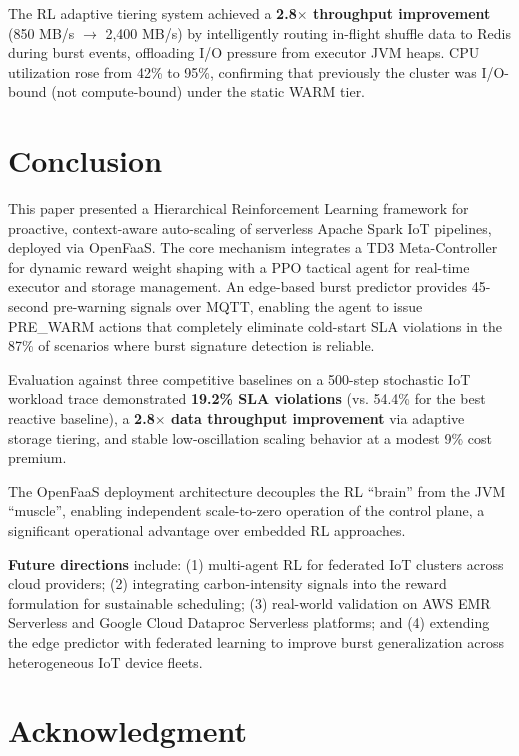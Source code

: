 \documentclass[10pt, conference, compsocconf]{IEEEtran}
\begin{document}
The RL adaptive tiering system achieved a \textbf{2.8$\times$ throughput improvement} (850 MB/s $\to$ 2,400 MB/s) by intelligently routing in-flight shuffle data to Redis during burst events, offloading I/O pressure from executor JVM heaps. CPU utilization rose from 42\% to 95\%, confirming that previously the cluster was I/O-bound (not compute-bound) under the static WARM tier.

\section{Conclusion}

This paper presented a Hierarchical Reinforcement Learning framework for proactive, context-aware auto-scaling of serverless Apache Spark IoT pipelines, deployed via OpenFaaS. The core mechanism integrates a TD3 Meta-Controller for dynamic reward weight shaping with a PPO tactical agent for real-time executor and storage management. An edge-based burst predictor provides 45-second pre-warning signals over MQTT, enabling the agent to issue PRE\_WARM actions that completely eliminate cold-start SLA violations in the 87\% of scenarios where burst signature detection is reliable.

Evaluation against three competitive baselines on a 500-step stochastic IoT workload trace demonstrated \textbf{19.2\% SLA violations} (vs. 54.4\% for the best reactive baseline), a \textbf{2.8$\times$ data throughput improvement} via adaptive storage tiering, and stable low-oscillation scaling behavior at a modest 9\% cost premium.

The OpenFaaS deployment architecture decouples the RL ``brain'' from the JVM ``muscle'', enabling independent scale-to-zero operation of the control plane, a significant operational advantage over embedded RL approaches.

\textbf{Future directions} include: (1) multi-agent RL for federated IoT clusters across cloud providers; (2) integrating carbon-intensity signals into the reward formulation for sustainable scheduling; (3) real-world validation on AWS EMR Serverless and Google Cloud Dataproc Serverless platforms; and (4) extending the edge predictor with federated learning to improve burst generalization across heterogeneous IoT device fleets.

\section*{Acknowledgment}
\end{document}
